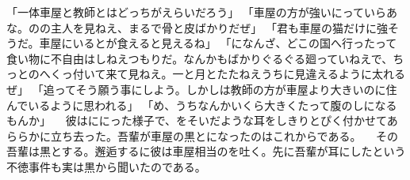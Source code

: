 \documentclass[a5j]{ltjtbook}
\begin{document}
「一体車屋と教師とはどっちがえらいだろう」 \newline
「車屋の方が強いにっていらあな。のの主人を見ねえ、まるで骨と皮ばかりだぜ」 \newline
「君も車屋の猫だけに強そうだ。車屋にいるとが食えると見えるね」 \newline
「になんざ、どこの国へ行ったって食い物に不自由はしねえつもりだ。なんかもばかりぐるぐる廻っていねえで、ちっとのへくっ付いて来て見ねえ。一と月とたたねえうちに見違えるように太れるぜ」 \newline
「追ってそう願う事にしよう。しかしは教師の方が車屋より大きいのに住んでいるように思われる」 \newline
「め、うちなんかいくら大きくたって腹のしになるもんか」 \newline
　彼はににった様子で、をそいだような耳をしきりとぴく付かせてあららかに立ち去った。吾輩が車屋の黒とになったのはこれからである。 \newline
　その吾輩は黒とする。邂逅するに彼は車屋相当のを吐く。先に吾輩が耳にしたという不徳事件も実は黒から聞いたのである。 \newline
\end{document}
